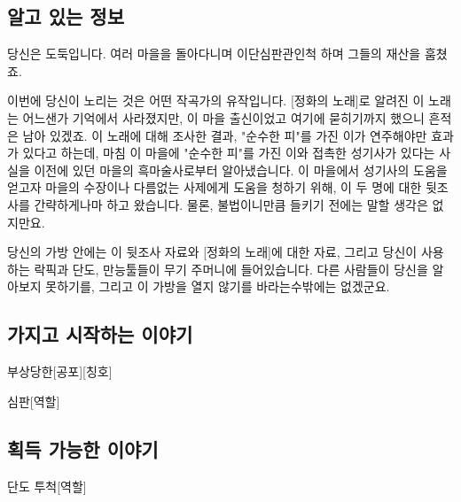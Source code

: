 \documentclass{report}
\begin{document}
	\subsection*{알고 있는 정보}
		당신은 도둑입니다. 여러 마을을 돌아다니며 이단심판관인척 하며 그들의 재산을 훔쳤죠.
		
		이번에 당신이 노리는 것은 어떤 작곡가의 유작입니다. [정화의 노래]로 알려진 이 노래는 어느샌가 기억에서 사라졌지만, 이 마을 출신이었고 여기에 묻히기까지 했으니 흔적은 남아 있겠죠. 이 노래에 대해 조사한 결과, "순수한 피"를 가진 이가 연주해야만 효과가 있다고 하는데, 마침 이 마을에 "순수한 피"를 가진 이와 접촉한 성기사가 있다는 사실을 이전에 있던 마을의 흑마술사로부터 알아냈습니다. 이 마을에서 성기사의 도움을 얻고자 마을의 수장이나 다름없는 사제에게 도움을 청하기 위해, 이 두 명에 대한 뒷조사를 간략하게나마 하고 왔습니다. 물론, 불법이니만큼 들키기 전에는 말할 생각은 없지만요.
		
		당신의 가방 안에는 이 뒷조사 자료와 [정화의 노래]에 대한 자료, 그리고 당신이 사용하는 락픽과 단도, 만능툴들이 무기 주머니에 들어있습니다. 다른 사람들이 당신을 알아보지 못하기를, 그리고 이 가방을 열지 않기를 바라는수밖에는 없겠군요.
	
	\subsection*{가지고 시작하는 이야기}
		\begin{spoiler}{부상당한}{[공포][칭호]}
			
		\end{spoiler}
		
		\begin{spoiler}{심판}{[역할]}
			
		\end{spoiler}
	
	\subsection*{획득 가능한 이야기}
	\begin{spoiler}{단도 투척}{[역할]}
		
	\end{spoiler}
	
\end{document}
